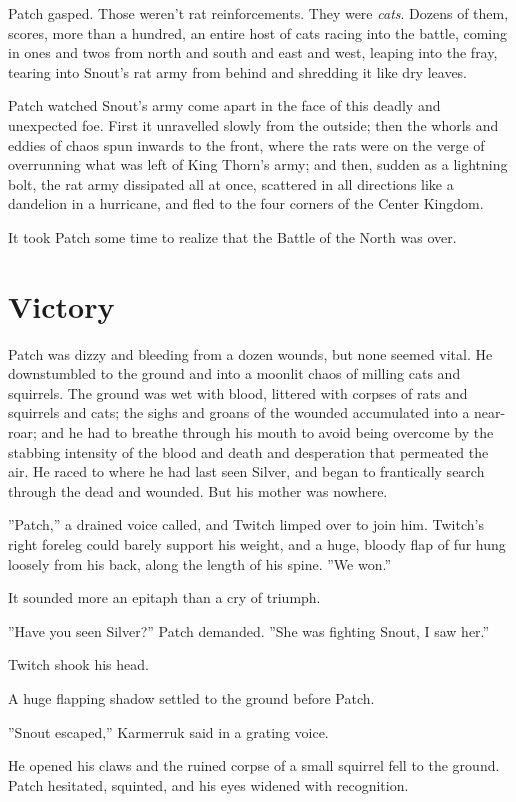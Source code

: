 \documentclass[12pt]{book}
\begin{document}
Patch gasped. Those weren't rat reinforcements. They were {\it cats}. Dozens of them, scores, more than a hundred, an entire host of cats racing into the battle, coming in ones and twos from north and south and east and west, leaping into the fray, tearing into Snout's rat army from behind and shredding it like dry leaves.

Patch watched Snout's army come apart in the face of this deadly and unexpected foe. First it unravelled slowly from the outside; then the whorls and eddies of chaos spun inwards to the front, where the rats were on the verge of overrunning what was left of King Thorn's army; and then, sudden as a lightning bolt, the rat army dissipated all at once, scattered in all directions like a dandelion in a hurricane, and fled to the four corners of the Center Kingdom.

It took Patch some time to realize that the Battle of the North was over.


\section{Victory}

Patch was dizzy and bleeding from a dozen wounds, but none seemed vital. He downstumbled to the ground and into a moonlit chaos of milling cats and squirrels. The ground was wet with blood, littered with corpses of rats and squirrels and cats; the sighs and groans of the wounded accumulated into a near-roar; and he had to breathe through his mouth to avoid being overcome by the stabbing intensity of the blood and death and desperation that permeated the air. He raced to where he had last seen Silver, and began to frantically search through the dead and wounded. But his mother was nowhere.

''Patch,'' a drained voice called, and Twitch limped over to join him. Twitch's right foreleg could barely support his weight, and a huge, bloody flap of fur hung loosely from his back, along the length of his spine. ''We won.''

It sounded more an epitaph than a cry of triumph.

''Have you seen Silver?'' Patch demanded. ''She was fighting Snout, I saw her.''

Twitch shook his head.

A huge flapping shadow settled to the ground before Patch.

''Snout escaped,'' Karmerruk said in a grating voice.

He opened his claws and the ruined corpse of a small squirrel fell to the ground. Patch hesitated, squinted, and his eyes widened with recognition.
\end{document}
